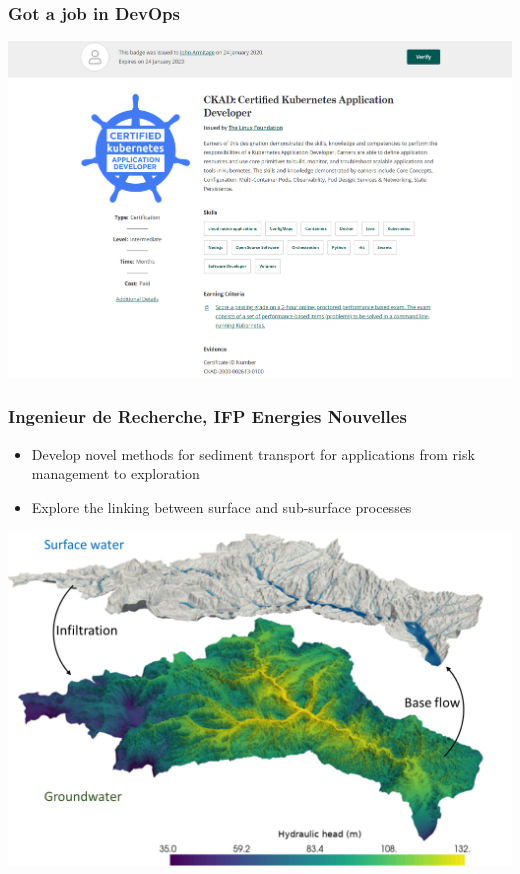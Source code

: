\documentclass[aspectratio=169]{beamer}
\begin{document}
\begin{frame}
    \frametitle{Got a job in DevOps}
    \centering
    \includegraphics[width=0.7\paperwidth]{./pictures/kubernetes.png}
\end{frame}

\begin{frame}
    \frametitle{Ingenieur de Recherche, IFP Energies Nouvelles}
    \begin{itemize}
        \item{Develop novel methods for sediment transport for applications from risk management to exploration}
        \item{Explore the linking between surface and sub-surface processes}
    \end{itemize}
    \centering
    \includegraphics[width=0.65\paperwidth]{./pictures/graphic1.png}
\end{frame}
\end{document}
